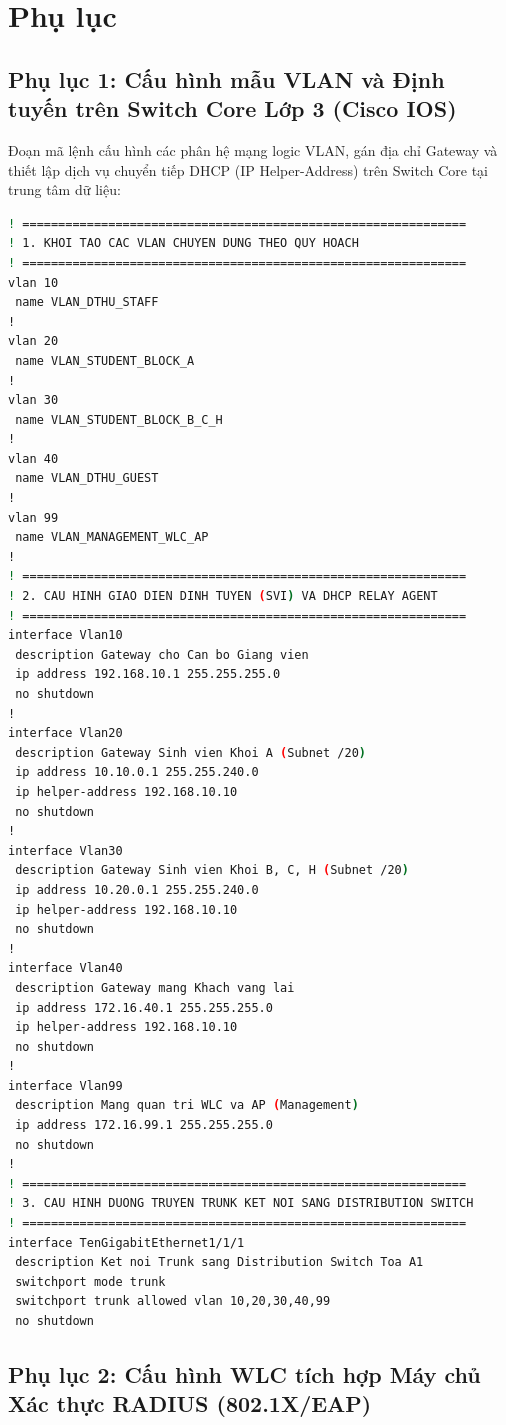 \chapter*{Phụ lục}

\section*{Phụ lục 1: Cấu hình mẫu VLAN và Định tuyến trên Switch Core Lớp 3 (Cisco IOS)}

Đoạn mã lệnh cấu hình các phân hệ mạng logic VLAN, gán địa chỉ Gateway và thiết lập dịch vụ chuyển tiếp DHCP (IP Helper-Address) trên Switch Core tại trung tâm dữ liệu:

\begin{lstlisting}[language=bash, caption={Cấu hình VLAN và SVI trên Switch Core Cisco}]
! ==============================================================
! 1. KHOI TAO CAC VLAN CHUYEN DUNG THEO QUY HOACH
! ==============================================================
vlan 10
 name VLAN_DTHU_STAFF
!
vlan 20
 name VLAN_STUDENT_BLOCK_A
!
vlan 30
 name VLAN_STUDENT_BLOCK_B_C_H
!
vlan 40
 name VLAN_DTHU_GUEST
!
vlan 99
 name VLAN_MANAGEMENT_WLC_AP
!
! ==============================================================
! 2. CAU HINH GIAO DIEN DINH TUYEN (SVI) VA DHCP RELAY AGENT
! ==============================================================
interface Vlan10
 description Gateway cho Can bo Giang vien
 ip address 192.168.10.1 255.255.255.0
 no shutdown
!
interface Vlan20
 description Gateway Sinh vien Khoi A (Subnet /20)
 ip address 10.10.0.1 255.255.240.0
 ip helper-address 192.168.10.10
 no shutdown
!
interface Vlan30
 description Gateway Sinh vien Khoi B, C, H (Subnet /20)
 ip address 10.20.0.1 255.255.240.0
 ip helper-address 192.168.10.10
 no shutdown
!
interface Vlan40
 description Gateway mang Khach vang lai
 ip address 172.16.40.1 255.255.255.0
 ip helper-address 192.168.10.10
 no shutdown
!
interface Vlan99
 description Mang quan tri WLC va AP (Management)
 ip address 172.16.99.1 255.255.255.0
 no shutdown
!
! ==============================================================
! 3. CAU HINH DUONG TRUYEN TRUNK KET NOI SANG DISTRIBUTION SWITCH
! ==============================================================
interface TenGigabitEthernet1/1/1
 description Ket noi Trunk sang Distribution Switch Toa A1
 switchport mode trunk
 switchport trunk allowed vlan 10,20,30,40,99
 no shutdown
\end{lstlisting}

\section*{Phụ lục 2: Cấu hình WLC tích hợp Máy chủ Xác thực RADIUS (802.1X/EAP)}

